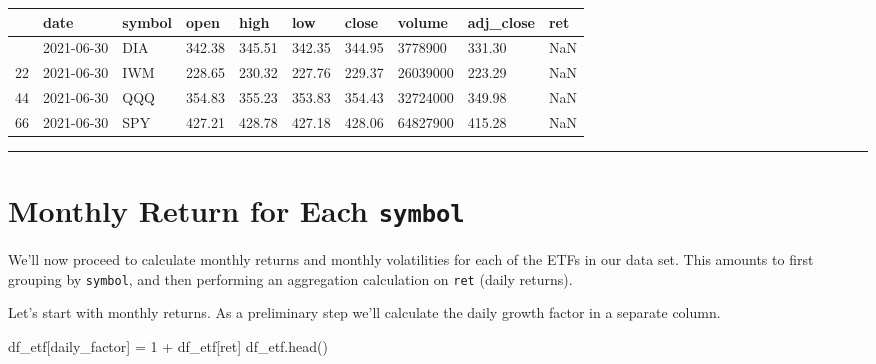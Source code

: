 \documentclass[
  letterpaper,
  DIV=11,
  numbers=noendperiod]{scrreprt}
\newenvironment{Shaded}{\begin{snugshade}}{\end{snugshade}}
\newcommand{\DecValTok}[1]{\textcolor[rgb]{0.68,0.00,0.00}{#1}}
\newcommand{\NormalTok}[1]{\textcolor[rgb]{0.00,0.23,0.31}{#1}}
\newcommand{\OperatorTok}[1]{\textcolor[rgb]{0.37,0.37,0.37}{#1}}
\newcommand{\StringTok}[1]{\textcolor[rgb]{0.13,0.47,0.30}{#1}}
\begin{document}
\begin{longtable}[]{@{}llllllllll@{}}
\toprule\noalign{}
& date & symbol & open & high & low & close & volume & adj\_close &
ret \\
\midrule\noalign{}
\endhead
\bottomrule\noalign{}
\endlastfoot
0 & 2021-06-30 & DIA & 342.38 & 345.51 & 342.35 & 344.95 & 3778900 &
331.30 & NaN \\
22 & 2021-06-30 & IWM & 228.65 & 230.32 & 227.76 & 229.37 & 26039000 &
223.29 & NaN \\
44 & 2021-06-30 & QQQ & 354.83 & 355.23 & 353.83 & 354.43 & 32724000 &
349.98 & NaN \\
66 & 2021-06-30 & SPY & 427.21 & 428.78 & 427.18 & 428.06 & 64827900 &
415.28 & NaN \\
\end{longtable}

\begin{center}\rule{0.5\linewidth}{0.5pt}\end{center}

\hypertarget{monthly-return-for-each-symbol}{%
\section{\texorpdfstring{Monthly Return for Each
\texttt{symbol}}{Monthly Return for Each symbol}}\label{monthly-return-for-each-symbol}}

We'll now proceed to calculate monthly returns and monthly volatilities
for each of the ETFs in our data set. This amounts to first grouping by
\texttt{symbol}, and then performing an aggregation calculation on
\texttt{ret} (daily returns).

Let's start with monthly returns. As a preliminary step we'll calculate
the daily growth factor in a separate column.

\begin{Shaded}
\begin{Highlighting}[]
\NormalTok{df\_etf[}\StringTok{\textquotesingle{}daily\_factor\textquotesingle{}}\NormalTok{] }\OperatorTok{=} \DecValTok{1} \OperatorTok{+}\NormalTok{ df\_etf[}\StringTok{\textquotesingle{}ret\textquotesingle{}}\NormalTok{]}
\NormalTok{df\_etf.head()}
\end{Highlighting}
\end{Shaded}
\end{document}
